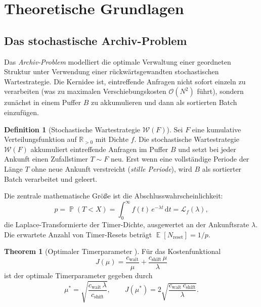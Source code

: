 ﻿\documentclass[a4paper,12pt]{scrreprt}
\theoremstyle{definition}
\newtheorem{definition}{Definition}[section]
\newtheorem{theorem}{Theorem}[section]
\DeclareMathOperator{\E}{\mathbb{E}}
\DeclareMathOperator{\Prob}{\mathbb{P}}
\begin{document}
	\section{Theoretische Grundlagen}
	
	\subsection{Das stochastische Archiv-Problem}
	
	Das \emph{Archiv-Problem} \cite{epp2026archiv} modelliert die optimale
	Verwaltung einer geordneten Struktur unter Verwendung einer
	rückwärtsgewandten stochastischen Wartestrategie. Die Kernidee ist,
	eintreffende Anfragen nicht sofort einzeln zu verarbeiten (was zu
	maximalen Verschiebungskosten $\mathcal{O}(N^2)$ führt), sondern
	zunächst in einem Puffer $B$ zu akkumulieren und dann als sortierten
	Batch einzufügen.
	
	\begin{definition}[Stochastische Wartestrategie $\mathcal{W}(F)$]
		\label{def:waitstrat}
		Sei $F$ eine kumulative Verteilungsfunktion auf $\mathbb{R}_{>0}$ mit
		Dichte $f$. Die stochastische Wartestrategie $\mathcal{W}(F)$ akkumuliert
		eintreffende Anfragen im Puffer $B$ und setzt bei jeder Ankunft einen
		Zufallstimer $T \sim F$ neu. Erst wenn eine vollständige Periode der
		Länge $T$ ohne neue Ankunft verstreicht (\emph{stille Periode}), wird
		$B$ als sortierter Batch verarbeitet und geleert.
	\end{definition}
	
	Die zentrale mathematische Größe ist die Abschlusswahrscheinlichkeit:
	\begin{equation}
		p = \Prob(T < X) = \int_0^\infty f(t)\,e^{-\lambda t}\,\mathrm{d}t
		= \mathcal{L}_f(\lambda),
		\label{eq:abschluss}
	\end{equation}
	die Laplace-Transformierte der Timer-Dichte, ausgewertet an der
	Ankunftsrate $\lambda$. Die erwartete Anzahl von Timer-Resets beträgt
	$\E[N_{\text{reset}}] = 1/p$.
	
	\begin{theorem}[Optimaler Timerparameter \cite{epp2026archiv}]
		\label{thm:optmu}
		Für das Kostenfunktional
		\begin{equation}
			J(\mu) = \frac{c_{\mathrm{wait}}}{\mu} + \frac{c_{\mathrm{shift}}\,\mu}{\lambda}
			\label{eq:cost}
		\end{equation}
		ist der optimale Timerparameter gegeben durch
		\begin{equation}
			\mu^* = \sqrt{\frac{c_{\mathrm{wait}}\,\lambda}{c_{\mathrm{shift}}}},
			\qquad
			J(\mu^*) = 2\sqrt{\frac{c_{\mathrm{wait}}\,c_{\mathrm{shift}}}{\lambda}}.
			\label{eq:muopt}
		\end{equation}
	\end{theorem}
	
\end{document}
